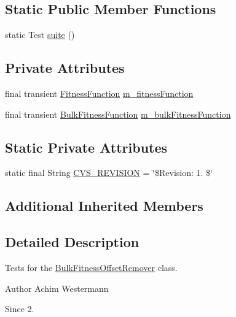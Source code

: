 \subsection*{Static Public Member Functions}
\begin{DoxyCompactItemize}
\item 
static Test \hyperlink{classorg_1_1jgap_1_1impl_1_1_bulk_fitness_offset_remover_test_a37493b7e43c05b205cb5bd79038fbf68}{suite} ()
\end{DoxyCompactItemize}
\subsection*{Private Attributes}
\begin{DoxyCompactItemize}
\item 
final transient \hyperlink{classorg_1_1jgap_1_1_fitness_function}{Fitness\-Function} \hyperlink{classorg_1_1jgap_1_1impl_1_1_bulk_fitness_offset_remover_test_a95ce67f68c7c6892c52d27ee6a74cae0}{m\-\_\-fitness\-Function}
\item 
final transient \hyperlink{classorg_1_1jgap_1_1_bulk_fitness_function}{Bulk\-Fitness\-Function} \hyperlink{classorg_1_1jgap_1_1impl_1_1_bulk_fitness_offset_remover_test_abee16fba385081beafcf80b3bd269be0}{m\-\_\-bulk\-Fitness\-Function}
\end{DoxyCompactItemize}
\subsection*{Static Private Attributes}
\begin{DoxyCompactItemize}
\item 
static final String \hyperlink{classorg_1_1jgap_1_1impl_1_1_bulk_fitness_offset_remover_test_ac70f40c6296c050d30a1c5447faaa52a}{C\-V\-S\-\_\-\-R\-E\-V\-I\-S\-I\-O\-N} = \char`\"{}\$Revision\-: 1. \$\char`\"{}
\end{DoxyCompactItemize}
\subsection*{Additional Inherited Members}


\subsection{Detailed Description}
Tests for the \hyperlink{classorg_1_1jgap_1_1impl_1_1_bulk_fitness_offset_remover}{Bulk\-Fitness\-Offset\-Remover} class.

\begin{DoxyAuthor}{Author}
Achim Westermann 
\end{DoxyAuthor}
\begin{DoxySince}{Since}
2. 
\end{DoxySince}


